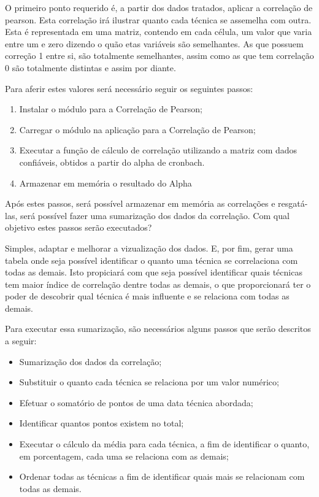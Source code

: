 O primeiro ponto requerido é, a partir dos dados tratados, aplicar a correlação de pearson. Esta correlação irá ilustrar
quanto cada técnica se assemelha com outra. Esta é representada em uma matriz, contendo em cada célula, um valor que varia entre um
e zero dizendo o quão etas variáveis são semelhantes. As que possuem correção 1 entre si, são totalmente semelhantes, assim como as que tem
correlação 0 são totalmente distintas e assim por diante.

Para aferir estes valores será necessário seguir os seguintes passos:

\begin{enumerate}
    \item Instalar o módulo para a Correlação de Pearson;
    \item Carregar o módulo  na aplicação para a Correlação de Pearson;
    \item Executar a função de cálculo de correlação utilizando a matriz com dados confiáveis, obtidos a partir do alpha de cronbach.
    \item Armazenar em memória o resultado do Alpha
\end{enumerate}

Após estes passos, será possível armazenar em memória as correlações e resgatá-las, será possível fazer uma sumarização dos dados
da correlação. Com qual objetivo estes passos serão executados?

Simples, adaptar e melhorar a vizualização dos dados. E, por fim, gerar uma tabela onde seja possível identificar o quanto uma técnica
se correlaciona com todas as demais. Isto propiciará com que seja possível identificar quais técnicas tem maior índice de correlação
dentre todas as demais, o que proporcionará ter o poder de descobrir qual técnica é mais influente e se relaciona com todas as demais.


Para executar essa sumarização, são necessários alguns passos que serão descritos a seguir:

\begin{itemize}
    \item Sumarização dos dados da correlação;
    \item Substituir o quanto cada técnica se relaciona por um valor numérico;
    \item Efetuar o somatório de pontos de uma data técnica abordada;
    \item Identificar quantos pontos existem no total;
    \item Executar o cálculo da média para cada técnica, a fim de identificar o quanto, em porcentagem, cada uma
        se relaciona com as demais;
    \item Ordenar todas as técnicas a fim de identificar quais mais se relacionam com todas as demais.
\end{itemize}

